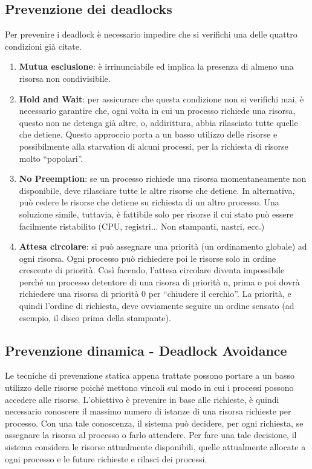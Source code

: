 \documentclass[a4paper]{article}
\begin{document}
\subsection{Prevenzione dei deadlocks}
Per prevenire i deadlock è necessario impedire che si verifichi una delle quattro condizioni già citate.
\begin{enumerate}
    \item \textbf{Mutua esclusione}: è irrinunciabile ed implica la presenza di almeno una risorsa non condivisibile.
    \item \textbf{Hold and Wait}: per assicurare che questa condizione non si verifichi mai, è necessario garantire che, ogni volta in cui un processo richiede una risorsa, questo non ne detenga già altre, o, addirittura, abbia rilasciato tutte quelle che detiene.
          Questo approccio porta a un basso utilizzo delle risorse e possibilmente alla starvation di alcuni processi, per la richiesta di risorse molto ``popolari''.
    \item \textbf{No Preemption}: se un processo richiede una risorsa momentaneamente non disponibile, deve rilasciare tutte le altre risorse che detiene. In alternativa, può cedere le risorse che detiene su richiesta di un altro processo. Una soluzione simile, tuttavia, è fattibile solo per risorse il cui stato può essere facilmente ristabilito (CPU, registri... Non stampanti, nastri, ecc.)
    \item \textbf{Attesa circolare}: si può assegnare una priorità (un ordinamento globale) ad ogni risorsa. Ogni processo può richiedere poi le risorse solo in ordine crescente di priorità. Così facendo, l'attesa circolare diventa impossibile perché un processo detentore di una risorsa di priorità n, prima o poi dovrà richiedere una risorsa di priorità 0 per ``chiudere il cerchio''. La priorità, e quindi l'ordine di richiesta, deve ovviamente seguire un ordine sensato (ad esempio, il disco prima della stampante).
\end{enumerate}

\subsection{Prevenzione dinamica - Deadlock Avoidance}
Le tecniche di prevenzione statica appena trattate possono portare a un basso utilizzo delle risorse poiché mettono vincoli sul modo in cui i processi possono accedere alle risorse. L'obiettivo è prevenire in base alle richieste, è quindi necessario conoscere il massimo numero di istanze di una risorsa richieste per processo. Con una tale conoscenza, il sistema può decidere, per ogni richiesta, se assegnare la risorsa al processo o farlo attendere. Per fare una tale decisione, il sistema considera le risorse attualmente disponibili, quelle attualmente allocate a ogni processo e le future richieste e rilasci dei processi.
\end{document}

